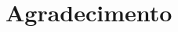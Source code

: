 \documentclass[
  11pt,
  aspectratio=169,
  english,                    %
  french,                     %
  spanish,                    %
  brazil                      %
  ]{beamer}
\begin{document}






\section[Agradecimento]{Agradecimento}\label{sec:agradecimentos}
\end{document}
